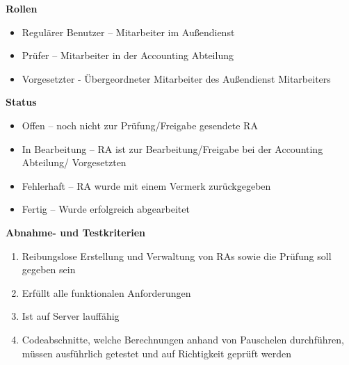 \textbf{Rollen}
\begin{itemize}
	\item Regulärer Benutzer – Mitarbeiter im Außendienst
	\item Prüfer – Mitarbeiter in der Accounting Abteilung
	\item Vorgesetzter - Übergeordneter Mitarbeiter des Außendienst Mitarbeiters
\end{itemize}

\textbf{Status}
\begin{itemize}
	\item Offen – noch nicht zur Prüfung/Freigabe gesendete RA
	\item In Bearbeitung – RA ist zur Bearbeitung/Freigabe bei der Accounting Abteilung/ Vorgesetzten
	\item Fehlerhaft – RA wurde mit einem Vermerk zurückgegeben
	\item Fertig – Wurde erfolgreich abgearbeitet
\end{itemize}

\textbf{Abnahme- und Testkriterien}
\begin{enumerate}
	\item Reibungslose Erstellung und Verwaltung von RAs sowie die Prüfung soll gegeben sein
	\item Erfüllt alle funktionalen Anforderungen
	\item Ist auf Server lauffähig
	\item Codeabschnitte, welche Berechnungen anhand von Pauschelen durchführen, müssen ausführlich getestet und auf Richtigkeit geprüft werden
\end{enumerate}
